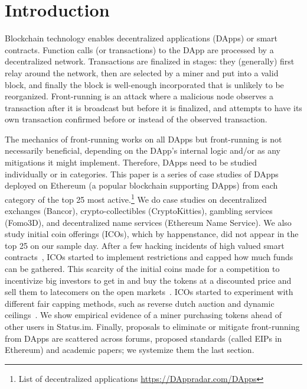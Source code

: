 
\section{Introduction} \label{sec:intro}

Blockchain technology enables decentralized applications (DApps) or smart contracts. Function calls (or transactions) to the DApp are processed by a decentralized network. Transactions are finalized in stages: they (generally) first relay around the network, then are selected by a miner and put into a valid block, and finally the block is well-enough incorporated that is unlikely to be reorganized. Front-running is an attack where a malicious node observes a transaction after it is broadcast but before it is finalized, and attempts to have its own transaction confirmed before or instead of the observed transaction. 

The mechanics of front-running works on all DApps but front-running is not necessarily beneficial, depending on the DApp's internal logic and/or as any mitigations it might implement. Therefore, DApps need to be studied individually or in categories. This paper is a series of case studies of DApps deployed on Ethereum (a popular blockchain supporting DApps) from each category of the top 25 most active.\footnote{List of decentralized applications \url{https://DAppradar.com/DApps}} We do case studies on decentralized exchanges (\eg Bancor), crypto-collectibles (\eg CryptoKitties), gambling services (\eg Fomo3D), and decentralized name services (\eg Ethereum Name Service). We also study initial coin offerings (ICOs), which by happenstance, did not appear in the top 25 on our sample day. After a few hacking incidents of high valued smart contracts~\cite{siegel2016daohack}, ICOs started to implement restrictions and capped how much funds can be gathered. This scarcity of the initial coins made for a competition to incentivize big investors to get in and buy the tokens at a discounted price and sell them to latecomers on the open markets~\cite{zetzsche2018ico, li2018initial}. ICOs started to experiment with different fair capping methods, such as reverse dutch auction and dynamic ceilings~\cite{kaal2017initial}. We show empirical evidence of a miner purchasing tokens ahead of other users in Status.im. Finally, proposals to eliminate or mitigate front-running from DApps are scattered across forums, proposed standards (called EIPs in Ethereum) and academic papers; we systemize them the last section. 

